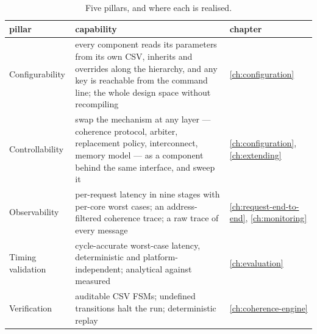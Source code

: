 \begin{table}[htbp]\centering\small
\caption{Five pillars, and where each is realised.}\label{tab:pillars}
\begin{tabularx}{\textwidth}{@{}lYl@{}}
\toprule pillar & capability & chapter \\ \midrule
Configurability & every component reads its parameters from its own CSV, inherits and overrides along the hierarchy, and any key is reachable from the command line; the whole design space without recompiling & \ref{ch:configuration} \\
Controllability & swap the mechanism at any layer --- coherence protocol, arbiter, replacement policy, interconnect, memory model --- as a component behind the same interface, and sweep it & \ref{ch:configuration}, \ref{ch:extending} \\
Observability & per-request latency in nine stages with per-core worst cases; an address-filtered coherence trace; a raw trace of every message & \ref{ch:request-end-to-end}, \ref{ch:monitoring} \\
Timing validation & cycle-accurate worst-case latency, deterministic and platform-independent; analytical against measured & \ref{ch:evaluation} \\
Verification & auditable CSV FSMs; undefined transitions halt the run; deterministic replay & \ref{ch:coherence-engine} \\
\bottomrule
\end{tabularx}
\end{table}

